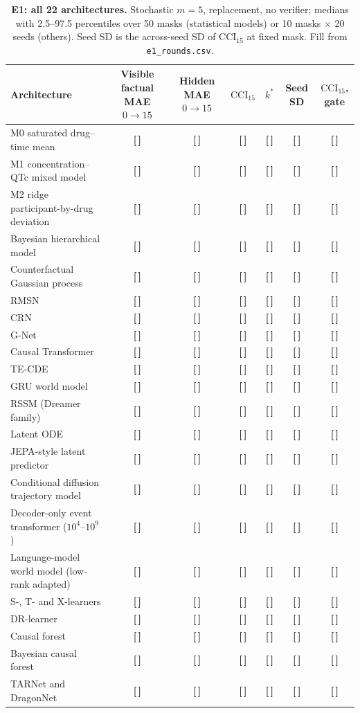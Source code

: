 \documentclass[11pt,a4paper]{article}
\newcommand{\T}{{\color{red}\textbf{[\,]}}}
\newcommand{\CCI}{\mathrm{CCI}}
\begin{document}
\begin{table}[!htbp]\centering\scriptsize
\caption{\textbf{E1: all 22 architectures.} Stochastic $m=5$, replacement, no verifier; medians with 2.5--97.5 percentiles over 50 masks (statistical models) or 10 masks $\times$ 20 seeds (others). Seed SD is the across-seed SD of $\CCI_{15}$ at fixed mask. Fill from \texttt{e1\_rounds.csv}.}
\begin{tabularx}{\textwidth}{@{}p{3.9cm} C C C C C C@{}}\toprule
Architecture & Visible factual MAE $0\to15$ & Hidden MAE $0\to15$ & $\CCI_{15}$ & $k^*$ & Seed SD & $\CCI_{15}$, gate\\\midrule
M0 saturated drug--time mean & \T & \T & \T & \T & \T & \T\\
M1 concentration--QTc mixed model & \T & \T & \T & \T & \T & \T\\
M2 ridge participant-by-drug deviation & \T & \T & \T & \T & \T & \T\\
Bayesian hierarchical model & \T & \T & \T & \T & \T & \T\\
Counterfactual Gaussian process & \T & \T & \T & \T & \T & \T\\
RMSN & \T & \T & \T & \T & \T & \T\\
CRN & \T & \T & \T & \T & \T & \T\\
G-Net & \T & \T & \T & \T & \T & \T\\
Causal Transformer & \T & \T & \T & \T & \T & \T\\
TE-CDE & \T & \T & \T & \T & \T & \T\\
GRU world model & \T & \T & \T & \T & \T & \T\\
RSSM (Dreamer family) & \T & \T & \T & \T & \T & \T\\
Latent ODE & \T & \T & \T & \T & \T & \T\\
JEPA-style latent predictor & \T & \T & \T & \T & \T & \T\\
Conditional diffusion trajectory model & \T & \T & \T & \T & \T & \T\\
Decoder-only event transformer ($10^4$--$10^9$) & \T & \T & \T & \T & \T & \T\\
Language-model world model (low-rank adapted) & \T & \T & \T & \T & \T & \T\\
S-, T- and X-learners & \T & \T & \T & \T & \T & \T\\
DR-learner & \T & \T & \T & \T & \T & \T\\
Causal forest & \T & \T & \T & \T & \T & \T\\
Bayesian causal forest & \T & \T & \T & \T & \T & \T\\
TARNet and DragonNet & \T & \T & \T & \T & \T & \T\\
\bottomrule\end{tabularx}
\end{table}
\end{document}

